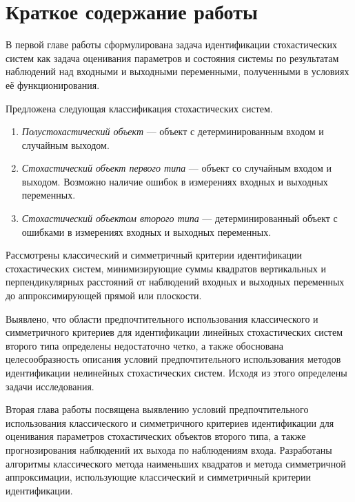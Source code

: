\section{Краткое содержание работы}

В первой главе работы сформулирована задача идентификации стохастических систем как
задача оценивания параметров и состояния системы по результатам наблюдений над
входными и выходными переменными, полученными в условиях её функционирования.

Предложена следующая классификация стохастических систем.
\begin{enumerate}
\item \emph{Полустохастический объект} --- объект с детерминированным входом и
  случайным выходом.
\item \emph{Стохастический объект первого типа} --- объект со случайным входом и выходом.
  Возможно наличие ошибок в измерениях входных и выходных переменных.
\item \emph{Стохастический объектом второго типа} --- детерминированный объект с ошибками
  в измерениях входных и выходных переменных.
\end{enumerate}

Рассмотрены классический и симметричный критерии идентификации стохастических систем,
минимизирующие суммы квадратов вертикальных и перпендикулярных расстояний от наблюдений
входных и выходных переменных до аппроксимирующей прямой или плоскости.

Выявлено, что области предпочтительного использования классического и симметричного
критериев для идентификации линейных стохастических систем второго типа
определены недостаточно четко, а также обоснована целесообразность
описания условий предпочтительного использования методов идентификации
нелинейных стохастических систем.
Исходя из этого определены задачи исследования.

Вторая глава работы посвящена выявлению условий предпочтительного использования
классического и симметричного критериев идентификации
для оценивания параметров стохастических объектов второго типа,
а также прогнозирования наблюдений их выхода по наблюдениям входа.
Разработаны алгоритмы классического метода наименьших квадратов и метода симметричной
аппроксимации, использующие классический и симметричный критерии идентификации.

